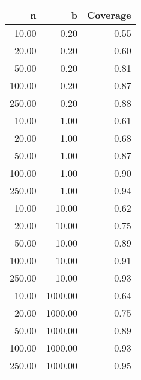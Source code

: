 
\begin{tabular}{rrr}
  \hline
n & b & Coverage \\ 
  \hline
10.00 & 0.20 & 0.55 \\ 
  20.00 & 0.20 & 0.60 \\ 
  50.00 & 0.20 & 0.81 \\ 
  100.00 & 0.20 & 0.87 \\ 
  250.00 & 0.20 & 0.88 \\ 
  10.00 & 1.00 & 0.61 \\ 
  20.00 & 1.00 & 0.68 \\ 
  50.00 & 1.00 & 0.87 \\ 
  100.00 & 1.00 & 0.90 \\ 
  250.00 & 1.00 & 0.94 \\ 
  10.00 & 10.00 & 0.62 \\ 
  20.00 & 10.00 & 0.75 \\ 
  50.00 & 10.00 & 0.89 \\ 
  100.00 & 10.00 & 0.91 \\ 
  250.00 & 10.00 & 0.93 \\ 
  10.00 & 1000.00 & 0.64 \\ 
  20.00 & 1000.00 & 0.75 \\ 
  50.00 & 1000.00 & 0.89 \\ 
  100.00 & 1000.00 & 0.93 \\ 
  250.00 & 1000.00 & 0.95 \\ 
   \hline
\end{tabular}